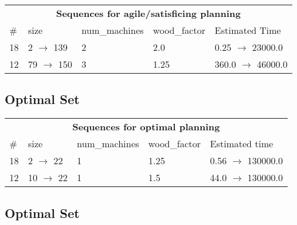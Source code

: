 \documentclass{article}
\begin{document}
                        \begin{center}
                        \begin{tabular}{l|l|l|l|l}
                        \multicolumn{5}{c}{\bf \large Sequences for agile/satisficing planning}\\
                        \# & size & num\_machines & wood\_factor & Estimated Time\\\midrule
                        18&2 $\rightarrow$ 139&2&2.0&0.25 $\rightarrow$ 23000.0\\
12&79 $\rightarrow$ 150&3&1.25&360.0 $\rightarrow$ 46000.0
                        \end{tabular}
                        \end{center}
                    
                            \subsection*{Optimal Set}

                            \begin{center}
                            \begin{tabular}{l|l|l|l|l}
                            \multicolumn{5}{c}{\bf \large Sequences for optimal planning}\\
                            \# & size & num\_machines & wood\_factor & Estimated time\\\midrule
                            18&2 $\rightarrow$ 22&1&1.25&0.56 $\rightarrow$ 130000.0\\
12&10 $\rightarrow$ 22&1&1.5&44.0 $\rightarrow$ 130000.0
                            \end{tabular}
                            \end{center}
                    
                                \subsection*{Optimal Set}
                                
\end{document}
